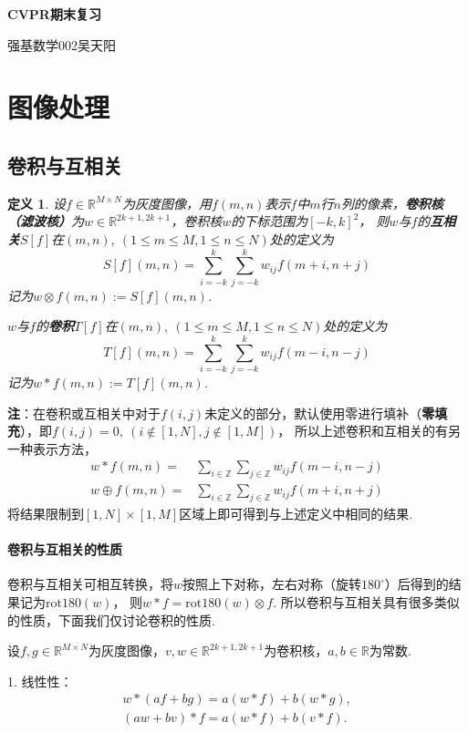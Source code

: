 \documentclass[12pt, a4paper, oneside]{ctexart}
\newtheorem{definition}{定义}
\numberwithin{equation}{section}  %
\theoremstyle{definition}
\newenvironment{myTitle}[1]{
    \begin{center}
    {\zihao{-2}\bf #1\\}
    \zihao{-4}\it
}{\end{center}}  %
\let\leq=\leqslant %
\def\R{\mathbb{R}}          %
\def\Z{\mathbb{Z}}          %
\def\del{\vspace{-1.5ex}}   %
\begin{document}
\begin{myTitle}{CVPR期末复习}
    强基数学002\quad 吴天阳
\end{myTitle}
\section{图像处理}
\subsection{卷积与互相关}  %
\begin{definition}
设$f\in \R^{M\times N}$为灰度图像，用$f(m,n)$表示$f$中$m$行$n$列的像素，\textbf{卷积核（滤波核）}为$w\in \R^{2k+1,2k+1}$，卷积核$w$的下标范围为$[-k,k]^2$，
则$w$与$f$的\textbf{互相关}$S[f]$在$(m,n),\ (1\leq m\leq M,1\leq n\leq N)$处的定义为
\begin{equation*}
    S[f](m,n) = \sum_{i=-k}^{k}\sum_{j=-k}^{k}w_{ij}f(m+i,n+j)
\end{equation*}
记为$w\otimes f(m,n):= S[f](m,n)$.

$w$与$f$的\textbf{卷积}$T[f]$在$(m,n),\ (1\leq m\leq M,1\leq n\leq N)$处的定义为
\begin{equation*}
    T[f](m,n) = \sum_{i=-k}^{k}\sum_{j=-k}^{k}w_{ij}f(m-i,n-j)
\end{equation*}
记为$w * f(m,n):= T[f](m,n)$.
\end{definition}
\noindent \textbf{注}：在卷积或互相关中对于$f(i,j)$未定义的部分，默认使用零进行填补（\textbf{零填充}），即$f(i,j) = 0,\ (i\notin[1,N],j\notin[1,M])$，
所以上述卷积和互相关的有另一种表示方法，
\begin{align*}
  w*f(m,n) =& \sum_{i\in \Z}\sum_{j\in \Z}w_{ij}f(m-i,n-j)\\
  w\oplus f(m,n) =& \sum_{i\in \Z}\sum_{j\in \Z}w_{ij}f(m+i,n+j)
\end{align*}
将结果限制到$[1,N]\times [1,M]$区域上即可得到与上述定义中相同的结果.

\paragraph{卷积与互相关的性质}
卷积与互相关可相互转换，将$w$按照上下对称，左右对称（旋转$180^{\circ}$）后得到的结果记为$\text{rot180}(w)$，
则$w*f = \text{rot180}(w)\otimes f$. 所以卷积与互相关具有很多类似的性质，下面我们仅讨论卷积的性质.

设$f, g\in \R^{M\times N}$为灰度图像，$v,w\in \R^{2k+1,2k+1}$为卷积核，$a,b\in\R$为常数.

1. 线性性：\del
\begin{align*}
    w * (af+bg) = a(w*f)+b(w*g),\\
    (aw+bv) * f = a(w * f) + b(v * f).
\end{align*}
\end{document}
